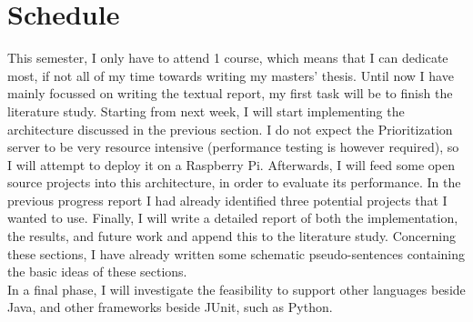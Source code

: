 \chapter*{Schedule}
This semester, I only have to attend 1 course, which means that I can dedicate most, if not all of my time towards writing my masters' thesis. Until now I have mainly focussed on writing the textual report, my first task will be to finish the literature study. Starting from next week, I will start implementing the architecture discussed in the previous section. I do not expect the Prioritization server to be very resource intensive (performance testing is however required), so I will attempt to deploy it on a Raspberry Pi. Afterwards, I will feed some open source projects into this architecture, in order to evaluate its performance. In the previous progress report I had already identified three potential projects that I wanted to use. Finally, I will write a detailed report of both the implementation, the results, and future work and append this to the literature study. Concerning these sections, I have already written some schematic pseudo-sentences containing the basic ideas of these sections.\\

\noindent In a final phase, I will investigate the feasibility to support other languages beside Java, and other frameworks beside JUnit, such as Python.


